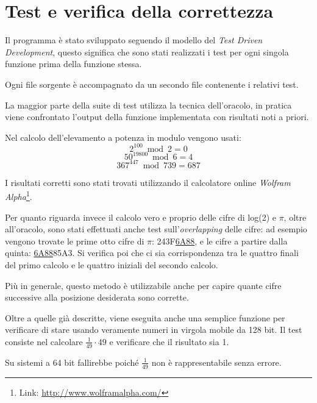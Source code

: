 \section{Test e verifica della correttezza}
Il programma è stato sviluppato seguendo il modello del \textit{Test Driven Development}, questo significa che sono stati realizzati i test per ogni singola funzione prima della funzione stessa.

Ogni file sorgente è accompagnato da un secondo file contenente i relativi test.

\noindent La maggior parte della suite di test utilizza la tecnica dell'oracolo, in pratica viene confrontato l'output della funzione implementata con risultati noti a priori.

Nel calcolo dell'elevamento a potenza in modulo vengono usati:
$$ 2^{100} \bmod 2 = 0 $$
$$ 50^{19800} \bmod 6 = 4 $$
$$ 367^{447} \bmod 739 = 687 $$

I risultati corretti sono stati trovati utilizzando il calcolatore online \textit{Wolfram Alpha}\footnote{Link: \href{http://www.wolframalpha.com/}{http://www.wolframalpha.com/}}.
\newline 

\noindent Per quanto riguarda invece il calcolo vero e proprio delle cifre di log(2) e $\pi$, oltre all'oracolo, sono stati effettuati anche test sull'\textit{overlapping} delle cifre: ad esempio vengono trovate le prime otto cifre di $\pi$: 243F\underline{6A88}, e le cifre a partire dalla quinta: \underline{6A88}85A3. Si verifica poi che ci sia corrispondenza tra le quattro finali del primo calcolo e le quattro iniziali del secondo calcolo.

Più in generale, questo metodo è utilizzabile anche per capire quante cifre successive alla posizione desiderata sono corrette.
\newline

\noindent Oltre a quelle già descritte, viene eseguita anche una semplice funzione per verificare di stare usando veramente numeri in virgola mobile da 128 bit. Il test consiste nel calcolare $\frac{1}{49} \cdot 49$ e verificare che il risultato sia 1.

Su sistemi a 64 bit fallirebbe poiché $\frac{1}{49}$ non è rappresentabile senza errore.